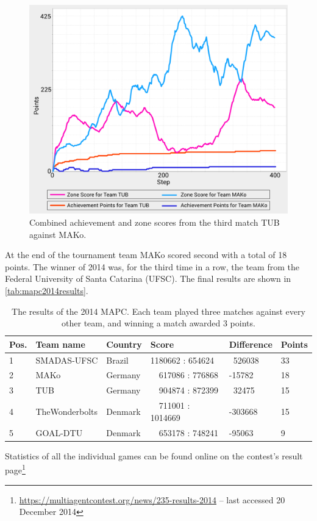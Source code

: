 \begin{figure}[h]
	\centering
	\includegraphics[width=\textwidth]{images/ZonesScoresAndAchievementPoints.png}
  \caption{Combined achievement and zone scores from the third match TUB against MAKo.}
	\label{fig:zonesScoresAndAchievementPoints}
\end{figure}
At the end of the tournament team MAKo scored second with a total of 18 points.
The winner of 2014 was, for the third time in a row, the team from the Federal University of Santa Catarina (UFSC).
The final results are shown in \autoref{tab:mapc2014results}.
\begin{table}[ht]
  \centering
  \begin{tabularx}{\textwidth}{| l | X | p{2cm} | X | p{2cm} | l |}
    \hline
    \textbf{Pos.} & \textbf{Team name} & \textbf{Country} & \textbf{Score}       & \textbf{Difference} & \textbf{Points} \\ \hline
    1             & SMADAS-UFSC        & Brazil           & 1180662 : 654624     & \ 526038            & 33              \\
    2             & MAKo               & Germany          & \ \ 617086 : 776868  & -15782              & 18              \\
    3             & TUB                & Germany          & \ \ 904874 : 872399  & \ 32475             & 15              \\
    4             & TheWonderbolts     & Denmark          & \ \ 711001 : 1014669 & -303668             & 15              \\
    5             & GOAL-DTU           & Denmark          & \ \ 653178 : 748241  & -95063              & 9               \\ \hline
  \end{tabularx}
  \caption{The results of the 2014 MAPC. Each team played three matches against every other team, and winning a match awarded 3 points.}
  \label{tab:mapc2014results}
\end{table}
Statistics of all the individual games can be found online on the contest's result page\footnote{\url{https://multiagentcontest.org/news/235-results-2014} -- last accessed 20 December 2014}

